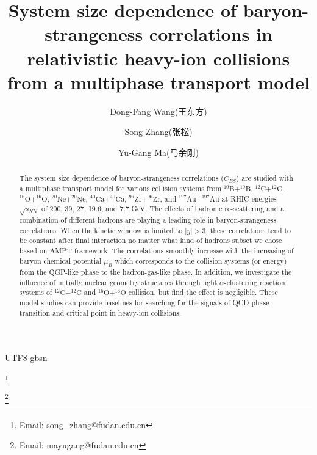 \documentclass[twocolumn,showpacs,preprintnumbers,amsmath,amssymb]{revtex4-1}
\begin{document}
\begin{CJK*} {UTF8} {gbsn}

\title{System size dependence of baryon-strangeness correlations in relativistic heavy-ion collisions from a multiphase transport model}

\author{Dong-Fang Wang(王东方)}



\author{Song Zhang(张松)}\thanks{Email: song\_zhang@fudan.edu.cn}

\author{Yu-Gang Ma(马余刚)}\thanks{Email:  mayugang@fudan.edu.cn}


\begin{abstract}
The system size dependence of baryon-strangeness  correlations ($C_{BS}$) are studied with a multiphase transport model for various collision systems from 
$\mathrm{^{10}B+^{10}B}$, $\mathrm{^{12}C+^{12}C}$, $\mathrm{^{16}O+^{16}O}$, $\mathrm{^{20}Ne+^{20}Ne}$, $\mathrm{^{40}Ca+^{40}Ca}$, $\mathrm{^{96}Zr+^{96}Zr}$, and $\mathrm{^{197}Au+^{197}Au}$ at RHIC energies $\sqrt{s_{NN}}$ of 200, 39, 27, 19.6, and 7.7 GeV.
The effects of hadronic re-scattering and a combination of different hadrons are playing a leading role in baryon-strangeness correlations. When  the kinetic window is limited to $|y|>3$, these correlations tend to be constant  after final interaction no matter what kind of hadrons subset we chose based on AMPT framework. The correlations smoothly increase with the increasing of baryon chemical potential $\mu_B$ which corresponds to the collision systems (or energy) from the QGP-like phase to the hadron-gas-like phase.
In addition, we investigate the influence of initially nuclear geometry structures through light $\alpha$-clustering reaction systems of $\mathrm{^{12}C+^{12}C}$ and $\mathrm{^{16}O+^{16}O}$ collision, but find the effect is negligible.
These model studies can provide baselines for searching for the signals of QCD phase transition and critical point in heavy-ion collisions.
 	\end{abstract}
\maketitle




\end{CJK*}
\end{document}
